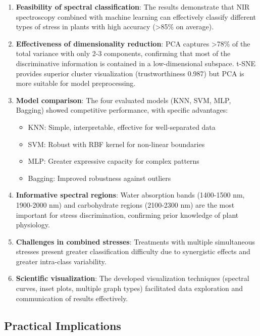 \documentclass[12pt,a4paper]{article}
\begin{document}
\begin{enumerate}
    \item \textbf{Feasibility of spectral classification}: The results demonstrate that NIR spectroscopy combined with machine learning can effectively classify different types of stress in plants with high accuracy (>85\% on average).
    
    \item \textbf{Effectiveness of dimensionality reduction}: PCA captures >78\% of the total variance with only 2-3 components, confirming that most of the discriminative information is contained in a low-dimensional subspace. t-SNE provides superior cluster visualization (trustworthiness 0.987) but PCA is more suitable for model preprocessing.
    
    \item \textbf{Model comparison}: The four evaluated models (KNN, SVM, MLP, Bagging) showed competitive performance, with specific advantages:
    \begin{itemize}
        \item KNN: Simple, interpretable, effective for well-separated data
        \item SVM: Robust with RBF kernel for non-linear boundaries
        \item MLP: Greater expressive capacity for complex patterns
        \item Bagging: Improved robustness against outliers
    \end{itemize}
    
    \item \textbf{Informative spectral regions}: Water absorption bands (1400-1500 nm, 1900-2000 nm) and carbohydrate regions (2100-2300 nm) are the most important for stress discrimination, confirming prior knowledge of plant physiology.
    
    \item \textbf{Challenges in combined stresses}: Treatments with multiple simultaneous stresses present greater classification difficulty due to synergistic effects and greater intra-class variability.
    
    \item \textbf{Scientific visualization}: The developed visualization techniques (spectral curves, inset plots, multiple graph types) facilitated data exploration and communication of results effectively.
\end{enumerate}

\subsection{Practical Implications}
\end{document}
